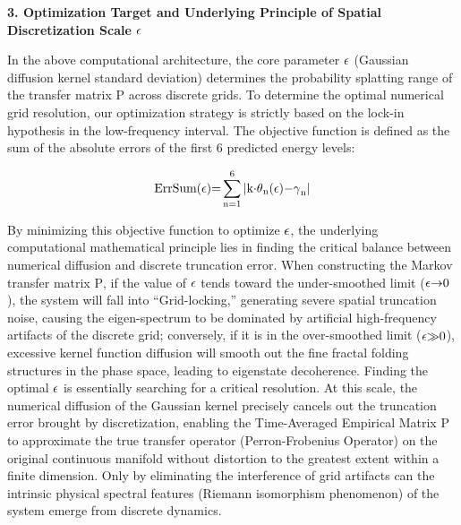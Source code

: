 \documentclass[fractalfract,article,submit,oneauthor,pdftex]{Definitions/mdpi}
\begin{document}
\textbf{3. Optimization Target and Underlying Principle of Spatial
Discretization Scale} \(\text{\ensuremath{\epsilon}}\)

In the above computational architecture, the core parameter \(\text{\ensuremath{\epsilon}}\)
(Gaussian diffusion kernel standard deviation) determines the
probability splatting range of the transfer matrix \(\text{P}\) across
discrete grids. To determine the optimal numerical grid resolution, our
optimization strategy is strictly based on the lock-in hypothesis in the
low-frequency interval. The objective function is defined as the sum of
the absolute errors of the first 6 predicted energy levels:

\begin{equation}
\text{ErrSum(\ensuremath{\epsilon})=}\sum_{\text{n}\text{=1}}^{\text{6}}\text{|}\text{k}\text{\ensuremath{\cdot}}\text{\ensuremath{\theta}}_{\text{n}}\text{(\ensuremath{\epsilon})\ensuremath{-}}\text{\ensuremath{\gamma}}_{\text{n}}\text{|}
\end{equation}

By minimizing this objective function to optimize \(\text{\ensuremath{\epsilon}}\), the
underlying computational mathematical principle lies in finding the
critical balance between numerical diffusion and discrete truncation
error. When constructing the Markov transfer matrix \(\text{P}\), if the
value of \(\text{\ensuremath{\epsilon}}\) tends toward the under-smoothed limit
(\(\text{\ensuremath{\epsilon}\ensuremath{\rightarrow}0}\)), the system will fall into ``Grid-locking,'' generating
severe spatial truncation noise, causing the eigen-spectrum to be
dominated by artificial high-frequency artifacts of the discrete grid;
conversely, if it is in the over-smoothed limit (\(\text{\ensuremath{\epsilon}\ensuremath{\gg}0}\)),
excessive kernel function diffusion will smooth out the fine fractal
folding structures in the phase space, leading to eigenstate
decoherence. Finding the optimal \(\text{\ensuremath{\epsilon}}\) is essentially searching
for a critical resolution. At this scale, the numerical diffusion of the
Gaussian kernel precisely cancels out the truncation error brought by
discretization, enabling the Time-Averaged Empirical Matrix \(\text{P}\)
to approximate the true transfer operator (Perron-Frobenius Operator) on
the original continuous manifold without distortion to the greatest
extent within a finite dimension. Only by eliminating the interference
of grid artifacts can the intrinsic physical spectral features (Riemann
isomorphism phenomenon) of the system emerge from discrete dynamics.
\end{document}
